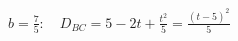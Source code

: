 \documentclass[border=2.5pt]{standalone}
\begin{document}
$\displaystyle b=\frac75:\quad D_{BC}=5-2t+\frac{t^2}{5}=\frac{(t-5)^2}{5}$
\end{document}
